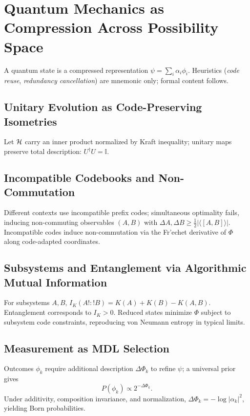 \documentclass[aps,preprint,onecolumn,longbibliography,nofootinbib]{revtex4-2}
\numberwithin{equation}{section}
\begin{document}
\section{Quantum Mechanics as Compression Across Possibility Space}
A quantum state is a compressed representation $\psi=\sum_i\alpha_i\phi_i$. Heuristics (\emph{code reuse}, \emph{redundancy cancellation}) are mnemonic only; formal content follows.

\subsection{Unitary Evolution as Code-Preserving Isometries}
Let ${\cal H}$ carry an inner product normalized by Kraft inequality; unitary maps preserve total description: $U^\dagger U=\mathbb{I}$.

\subsection{Incompatible Codebooks and Non-Commutation}
Different contexts use incompatible prefix codes; simultaneous optimality fails, inducing non-commuting observables $(A,B)$ with $\Delta A,\Delta B\ge\tfrac12|\langle[A,B]\rangle|$. Incompatible codes induce non-commutation via the Fr'echet derivative of $\Phi$ along code-adapted coordinates.

\subsection{Subsystems and Entanglement via Algorithmic Mutual Information}
For subsystems $A,B$, $I_K(A!:!B)=K(A)+K(B)-K(A,B)$. Entanglement corresponds to $I_K>0$. Reduced states minimize $\Phi$ subject to subsystem code constraints, reproducing von Neumann entropy in typical limits.

\subsection{Measurement as MDL Selection}
Outcomes ${\phi_k}$ require additional description $\Delta\Phi_k$ to refine $\psi$; a universal prior gives
\begin{equation}
P(\phi_k)\propto2^{-\Delta\Phi_k}.\label{eq:compprior}
\end{equation}
Under additivity, composition invariance, and normalization, $\Delta\Phi_k=-\log|\alpha_k|^2$, yielding Born probabilities.

\end{document}
